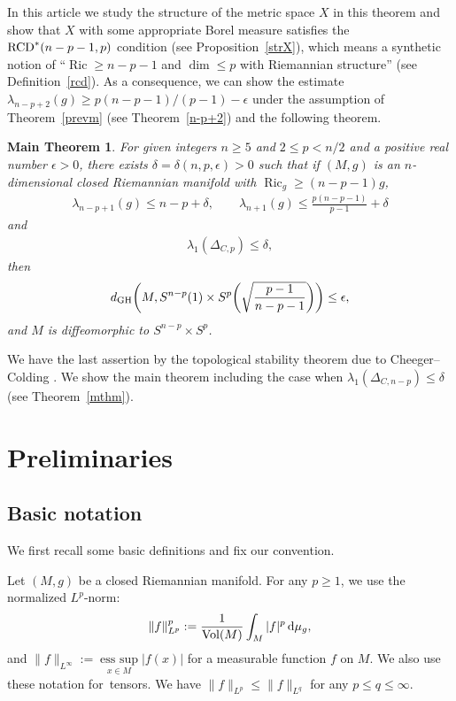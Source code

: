 \documentclass[pdftex]{sigma}
\numberwithin{equation}{section}
\newtheorem*{Ma}{Main Theorem}
\theoremstyle{definition}
\newcommand{\Ric}{\operatorname{Ric}}
\newcommand{\Vol}{\operatorname{Vol}}
\newcommand{\Card}{\operatorname{Card}}
\newcommand{\RCD}{{\rm RCD}^\ast}
\begin{document}
In this article we study the structure of the metric space $X$ in this theorem and show that $X$ with some appropriate Borel measure satisfies the $\RCD(n-p-1,p)$ condition (see Proposition~\ref{strX}), which means a synthetic notion of ``$\Ric\geq n-p-1$ and $\dim\leq p$ with Riemannian structure'' (see Definition~\ref{rcd}).
As a consequence, we can show the estimate $\lambda_{n-p+2}(g)\geq p(n-p-1)/(p-1)-\epsilon$ under the assumption of Theorem~\ref{prevm} (see Theorem~\ref{n-p+2}) and the following theorem.
\begin{Ma}
For given integers $n\geq 5$ and $2\leq p < n/2$ and a positive real number $\epsilon>0$, there exists $\delta=\delta(n,p,\epsilon)>0$ such that if $(M,g)$ is an $n$-dimensional closed Riemannian manifold with $\Ric_g\geq (n-p-1)g$,
\begin{gather*}
\lambda_{n-p+1}(g)\leq n-p+\delta,\qquad
\lambda_{n+1}(g)\leq \frac{p(n-p-1)}{p-1}+\delta
\end{gather*}
and
\begin{gather*}
\lambda_1(\Delta_{C,p})\leq \delta,
\end{gather*}
then
\[
d_{{\rm GH}}\bigg(M,S^{n-p}(1)\times S^p\bigg(\sqrt{\frac{p-1}{n-p-1}}\bigg)\bigg)\leq \epsilon,
\]
and $M$ is diffeomorphic to $S^{n-p}\times S^p$.
\end{Ma}
We have the last assertion by the topological stability theorem due to Cheeger--Colding \cite[Theorem~A.1.12]{CC1}.
We show the main theorem including the case when $\lambda_1(\Delta_{C,n-p})\leq \delta$ (see Theorem~\ref{mthm}).


\section{Preliminaries}
\subsection{Basic notation}
We first recall some basic definitions and fix our convention.


Let $(M,g)$ be a closed Riemannian manifold.
For any $p\geq 1$, we use the normalized $L^p$-norm:
\begin{gather*}
\|f\|_{L^p}^p:=\frac{1}{\Vol(M)}\int_M |f|^p\,{\rm d}\mu_g,
\end{gather*}
and $\|f\|_{L^\infty}:=\mathop{\mathrm{ess~sup}}\limits_{x\in M}|f(x)|$ for a measurable function $f$ on $M$. We also use these notation for~tensors.
We have $\|f\|_{L^p}\leq \|f\|_{L^q}$ for any $p\leq q \leq \infty$.
\end{document}
